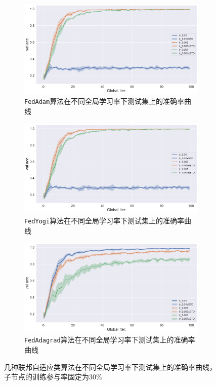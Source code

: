 \begin{figure}[ht]
\centering
\begin{subfigure}{.5\textwidth}
  \centering
  \includegraphics[width=.95\linewidth]{figures/adam-sample-30-compare-lr-val-acc.pdf}
  \caption{\texttt{FedAdam}算法在不同全局学习率下测试集上的准确率曲线}
  \label{fig:adam-sample-30-compare-lr-val-acc}
\end{subfigure}%
\begin{subfigure}{.5\textwidth}
  \centering
  \includegraphics[width=.95\linewidth]{figures/yogi-sample-30-compare-lr-val-acc.pdf}
  \caption{\texttt{FedYogi}算法在不同全局学习率下测试集上的准确率曲线}
  \label{fig:yogi-sample-30-compare-lr-val-acc}
\end{subfigure}
\begin{subfigure}{.6\textwidth}
  \centering
  \includegraphics[width=.95\linewidth]{figures/adagrad-sample-30-compare-lr-val-acc.pdf}
  \caption{\texttt{FedAdagrad}算法在不同全局学习率下测试集上的准确率曲线}
  \label{fig:adagrad-sample-30-compare-lr-val-acc}
\end{subfigure}
\caption{几种联邦自适应类算法在不同全局学习率下测试集上的准确率曲线，子节点的训练参与率固定为$30\%$}
\label{fig:fedopt-sample-30-compare-lr-val-acc}
\end{figure}

